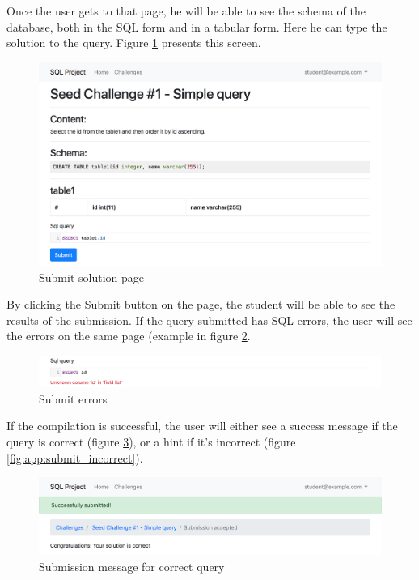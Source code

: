 Once the user gets to that page, he will be able to see the schema of the database, both in the SQL form and in a tabular form. Here he can type the solution to the query. Figure \ref{fig:app:submit} presents this screen.

\begin{figure}[ht]
    \centering
    \includegraphics[width=\textwidth/4*3]{Appendices/submit.png}
    \caption{Submit solution page}
    \label{fig:app:submit}
\end{figure}

By clicking the Submit button on the page, the student will be able to see the results of the submission. If the query submitted has SQL errors, the user will see the errors on the same page (example in figure \ref{fig:app:submit_errors}.

\begin{figure}
    \centering
    \includegraphics[width=\textwidth/4*3]{Appendices/submit_errors.png}
    \caption{Submit errors}
    \label{fig:app:submit_errors}
\end{figure}

If the compilation is successful, the user will either see a success message if the query is correct (figure \ref{fig:app:submit_correct}), or a hint if it's incorrect (figure \ref{fig:app:submit_incorrect}).

\begin{figure}[H]
    \centering
    \includegraphics[width=\textwidth/4*3]{Appendices/submit_correct.png}
    \caption{Submission message for correct query}
    \label{fig:app:submit_correct}
\end{figure}

